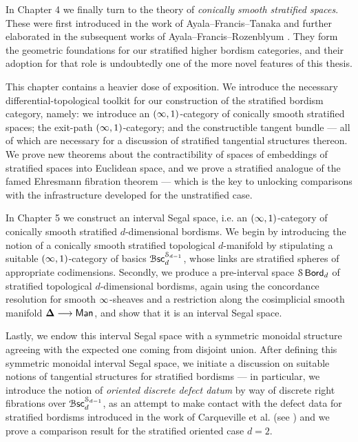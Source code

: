 In Chapter 4 we finally turn to the theory of \emph{conically smooth stratified spaces}. These were first introduced in the work of Ayala--Francis--Tanaka and further elaborated in the subsequent works of Ayala--Francis--Rozenblyum \cite{AFT1, AFR1, AFR2}. They form the geometric foundations for our stratified higher bordism categories, and their adoption for that role is undoubtedly one of the more novel features of this thesis.

This chapter contains a heavier dose of exposition. We introduce the necessary differential-topological toolkit for our construction of the stratified bordism category, namely: we introduce an $(\operatorname{\infty},1)$-category of conically smooth stratified spaces; the exit-path $(\operatorname{\infty},1)$-category; and the constructible tangent bundle — all of which are necessary for a discussion of stratified tangential structures thereon. We prove new theorems about the contractibility of spaces of embeddings of stratified spaces into Euclidean space, and we prove a stratified analogue of the famed Ehresmann fibration theorem — which is the key to unlocking comparisons with the infrastructure developed for the unstratified case.

In Chapter 5 we construct an interval Segal space, i.e. an $(\operatorname{\infty},1)$-category of conically smooth stratified $d$-dimensional bordisms. We begin by introducing the notion of a conically smooth stratified topological $d$-manifold by stipulating a suitable $(\operatorname{\infty},1)$-category of basics $\operatorname{\mathcal B\mathsf{sc}}_{d}^{\mathcal S_{d-1}}$, whose links are stratified spheres of appropriate codimensions. Secondly, we produce a pre-interval space $\mathcal S \operatorname{\mathsf{Bord}}_d$ of stratified topological $d$-dimensional bordisms, again using the concordance resolution for smooth $\operatorname{\infty}$-sheaves and a restriction along the cosimplicial smooth manifold $\mathbf\Delta \longrightarrow \operatorname{\sf Man}$, and show that it is an interval Segal space.

Lastly, we endow this interval Segal space with a symmetric monoidal structure agreeing with the expected one coming from disjoint union. After defining this symmetric monoidal interval Segal space, we initiate a discussion on suitable notions of tangential structures for stratified bordisms — in particular, we introduce the notion of \emph{oriented discrete defect datum} by way of discrete right fibrations over $\operatorname{\mathcal B\mathsf{sc}}_{d}^{\mathcal S_{d-1}}$, as an attempt to make contact with the defect data for stratified bordisms introduced in the work of Carqueville et al. (see \cite{CRS19}) and we prove a comparison result for the stratified oriented case $d=2$.

